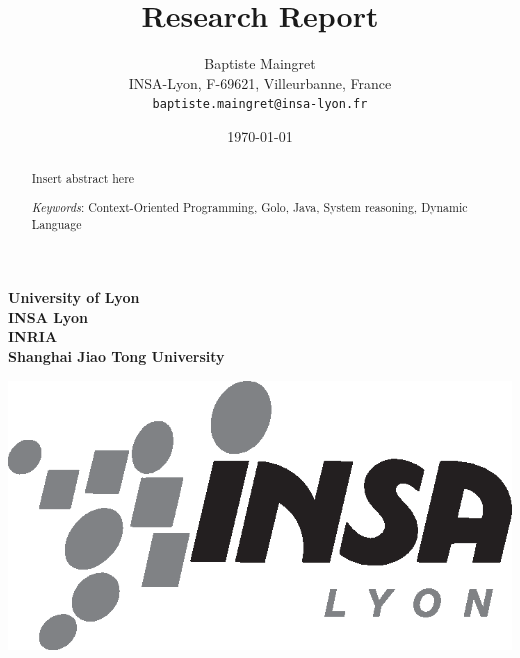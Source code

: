\documentclass[a4paper]{article}
\begin{document}
\hfill
\begin{minipage}{0.3\columnwidth}
\small
\centering
\textbf{
University of Lyon \\ %
INSA Lyon \\ %
INRIA \\
Shanghai Jiao Tong University
}
\end{minipage}
\hfill
\begin{minipage}[b]{0.25\columnwidth}
\includegraphics[width=\columnwidth]{logo/insa-noir.eps}%
\end{minipage}

\newpage

%
%

\title{Research Report}

\author{Baptiste Maingret\\[10pt]
INSA-Lyon, F-69621, Villeurbanne, France\\
\texttt{baptiste.maingret@insa-lyon.fr}}

\date{\today}
\newcommand{\Keywords}[1]{\par\noindent 
{\small{\em Keywords\/}: Context-Oriented Programming, Golo, Java, System reasoning, Dynamic Language}}
\maketitle

\begin{abstract} 
Insert abstract here
\Keywords{Context-Oriented Programming, Golo, Java, System reasoning, Dynamic Language}
\end{abstract}

\newpage

%
%
\end{document}
